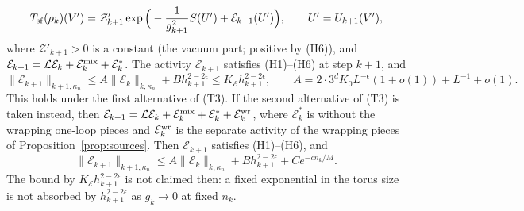 \begin{theorem}
\[
T_{\rm sf}(\rho_k)(V')=\mathcal Z'_{k+1}\exp\Big(-\frac1{g_{k+1}^2}S(U')+\mathcal E_{k+1}(U')\Big),\qquad U'=U_{k+1}(V'),
\]
where $\mathcal Z'_{k+1}>0$ is a constant (the vacuum part; positive by (H6)), and $\mathcal E_{k+1}=\mathcal L\mathcal E_k+\mathcal E^{\rm mix}_k+\mathcal E^*_k$. The activity $\mathcal E_{k+1}$ satisfies (H1)--(H6) at step $k+1$, and
\[
\|\mathcal E_{k+1}\|_{k+1,\kappa_n}\le A\|\mathcal E_k\|_{k,\kappa_n}+Bh_{k+1}^{2-2\epsilon}\le K_{\mathcal E}h_{k+1}^{2-2\epsilon},\qquad A=2\cdot3^dK_0L^{-\epsilon}(1+o(1))+L^{-1}+o(1).
\]
This holds under the first alternative of (T3). If the second alternative of (T3) is taken instead, then $\mathcal E_{k+1}=\mathcal L\mathcal E_k+\mathcal E^{\rm mix}_k+\mathcal E^*_k+\mathcal E^{\rm wr}_k$, where $\mathcal E^*_k$ is without the wrapping one-loop pieces and $\mathcal E^{\rm wr}_k$ is the separate activity of the wrapping pieces of Proposition~\ref{prop:sources}. Then $\mathcal E_{k+1}$ satisfies (H1)--(H6), and
\[
\|\mathcal E_{k+1}\|_{k+1,\kappa_n}\le A\|\mathcal E_k\|_{k,\kappa_n}+Bh_{k+1}^{2-2\epsilon}+Ce^{-cn_k/M} .
\]
The bound by $K_{\mathcal E}h_{k+1}^{2-2\epsilon}$ is not claimed then: a fixed exponential in the torus size is not absorbed by $h_{k+1}^{2-2\epsilon}$ as $g_k\to0$ at fixed $n_k$.
\end{theorem}

